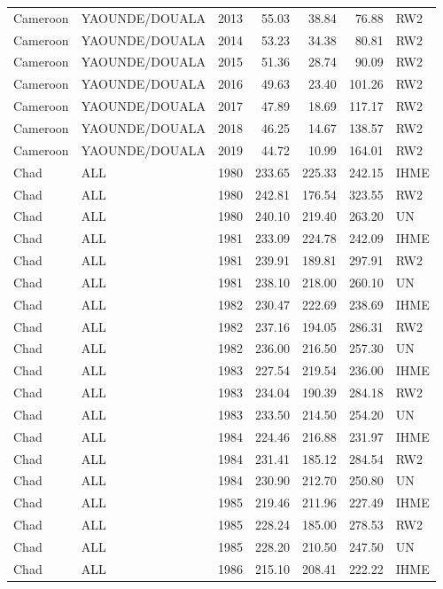 \begin{longtable}{lllrrrl}
  Cameroon & YAOUNDE/DOUALA & 2013 & 55.03 & 38.84 & 76.88 & RW2 \\ 
  Cameroon & YAOUNDE/DOUALA & 2014 & 53.23 & 34.38 & 80.81 & RW2 \\ 
  Cameroon & YAOUNDE/DOUALA & 2015 & 51.36 & 28.74 & 90.09 & RW2 \\ 
  Cameroon & YAOUNDE/DOUALA & 2016 & 49.63 & 23.40 & 101.26 & RW2 \\ 
  Cameroon & YAOUNDE/DOUALA & 2017 & 47.89 & 18.69 & 117.17 & RW2 \\ 
  Cameroon & YAOUNDE/DOUALA & 2018 & 46.25 & 14.67 & 138.57 & RW2 \\ 
  Cameroon & YAOUNDE/DOUALA & 2019 & 44.72 & 10.99 & 164.01 & RW2 \\ 
  Chad & ALL & 1980 & 233.65 & 225.33 & 242.15 & IHME \\ 
  Chad & ALL & 1980 & 242.81 & 176.54 & 323.55 & RW2 \\ 
  Chad & ALL & 1980 & 240.10 & 219.40 & 263.20 & UN \\ 
  Chad & ALL & 1981 & 233.09 & 224.78 & 242.09 & IHME \\ 
  Chad & ALL & 1981 & 239.91 & 189.81 & 297.91 & RW2 \\ 
  Chad & ALL & 1981 & 238.10 & 218.00 & 260.10 & UN \\ 
  Chad & ALL & 1982 & 230.47 & 222.69 & 238.69 & IHME \\ 
  Chad & ALL & 1982 & 237.16 & 194.05 & 286.31 & RW2 \\ 
  Chad & ALL & 1982 & 236.00 & 216.50 & 257.30 & UN \\ 
  Chad & ALL & 1983 & 227.54 & 219.54 & 236.00 & IHME \\ 
  Chad & ALL & 1983 & 234.04 & 190.39 & 284.18 & RW2 \\ 
  Chad & ALL & 1983 & 233.50 & 214.50 & 254.20 & UN \\ 
  Chad & ALL & 1984 & 224.46 & 216.88 & 231.97 & IHME \\ 
  Chad & ALL & 1984 & 231.41 & 185.12 & 284.54 & RW2 \\ 
  Chad & ALL & 1984 & 230.90 & 212.70 & 250.80 & UN \\ 
  Chad & ALL & 1985 & 219.46 & 211.96 & 227.49 & IHME \\ 
  Chad & ALL & 1985 & 228.24 & 185.00 & 278.53 & RW2 \\ 
  Chad & ALL & 1985 & 228.20 & 210.50 & 247.50 & UN \\ 
  Chad & ALL & 1986 & 215.10 & 208.41 & 222.22 & IHME \\ 

\end{longtable}
